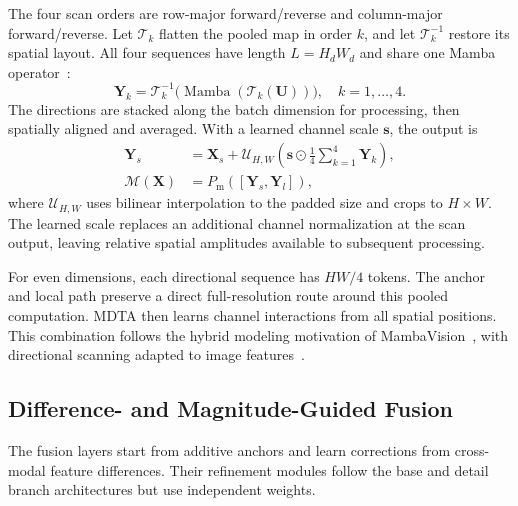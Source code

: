 The four scan orders are row-major forward/reverse and column-major forward/reverse. Let $\mathcal T_k$ flatten the pooled map in order $k$, and let $\mathcal T_k^{-1}$ restore its spatial layout. All four sequences have length $L=H_dW_d$ and share one Mamba operator~\cite{gu2023mamba}:
\begin{equation}
 \mathbf Y_k=\mathcal T_k^{-1}
 \big(\operatorname{Mamba}(\mathcal T_k(\mathbf U))\big),
 \quad k=1,\ldots,4.
\end{equation}
The directions are stacked along the batch dimension for processing, then spatially aligned and averaged. With a learned channel scale $\mathbf s$, the output is
\begin{equation}
\begin{aligned}
 \mathbf Y_s&=\mathbf X_s+\mathcal U_{H,W}
       \left(\mathbf s\odot\frac14\sum_{k=1}^{4}\mathbf Y_k\right),\\
 \mathcal M(\mathbf X)&=P_{\mathrm m}([\mathbf Y_s,\mathbf Y_l]),
\end{aligned}\label{eq:mixer}
\end{equation}
where $\mathcal U_{H,W}$ uses bilinear interpolation to the padded size and crops to $H\times W$. The learned scale replaces an additional channel normalization at the scan output, leaving relative spatial amplitudes available to subsequent processing.

For even dimensions, each directional sequence has $HW/4$ tokens. The anchor and local path preserve a direct full-resolution route around this pooled computation. MDTA then learns channel interactions from all spatial positions. This combination follows the hybrid modeling motivation of MambaVision~\cite{hatamizadeh2025mambavision}, with directional scanning adapted to image features~\cite{liu2024vmamba}.

\subsection{Difference- and Magnitude-Guided Fusion}
\label{subsec:gated_fusion}
The fusion layers start from additive anchors and learn corrections from cross-modal feature differences. Their refinement modules follow the base and detail branch architectures but use independent weights.


